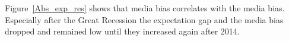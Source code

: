 \documentclass[review]{elsarticle}
\begin{document}

Figure~\ref{Abs_exp_res} shows that media bias correlates with the media bias. Especially after the Great Recession the expectation gap and the media bias dropped and remained low until they increased again after 2014. 


\end{document}
